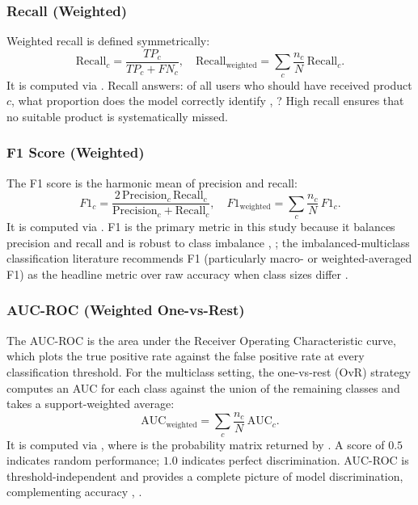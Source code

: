 \documentclass{icsthesis}
\begin{document}
\begin{mainmatter}
				\subsubsection{Recall (Weighted)}
					Weighted recall is defined symmetrically:
					\begin{equation*}
					    \mathrm{Recall}_c = \frac{TP_c}{TP_c + FN_c}, \quad \mathrm{Recall}_{\mathrm{weighted}} = \sum_c \frac{n_c}{N}\,\mathrm{Recall}_c.
					\end{equation*}
					It is computed via . Recall answers: of all users who should have received product $c$, what proportion does the model correctly identify \cite{ref79}, \cite{ref78}? High recall ensures that no suitable product is systematically missed.

				\subsubsection{F1 Score (Weighted)}
					The F1 score is the harmonic mean of precision and recall:
					\begin{equation*}
					    F1_c = \frac{2\,\mathrm{Precision}_c\,\mathrm{Recall}_c}{\mathrm{Precision}_c + \mathrm{Recall}_c}, \quad F1_{\mathrm{weighted}} = \sum_c \frac{n_c}{N}\,F1_c.
					\end{equation*}
					It is computed via . F1 is the primary metric in this study because it balances precision and recall and is robust to class imbalance \cite{ref78}, \cite{ref80}; the imbalanced-multiclass classification literature recommends F1 (particularly macro- or weighted-averaged F1) as the headline metric over raw accuracy when class sizes differ \cite{ref58}.

				\subsubsection{AUC-ROC (Weighted One-vs-Rest)}
					The AUC-ROC is the area under the Receiver Operating Characteristic curve, which plots the true positive rate against the false positive rate at every classification threshold. For the multiclass setting, the one-vs-rest (OvR) strategy computes an AUC for each class against the union of the remaining classes and takes a support-weighted average:
					\begin{equation*}
					    \mathrm{AUC}_{\mathrm{weighted}} = \sum_c \frac{n_c}{N}\,\mathrm{AUC}_c.
					\end{equation*}
					It is computed via , where  is the probability matrix returned by . A score of $0.5$ indicates random performance; $1.0$ indicates perfect discrimination. AUC-ROC is threshold-independent and provides a complete picture of model discrimination, complementing accuracy \cite{ref81}, \cite{ref82}.


\end{mainmatter}
\end{document}
